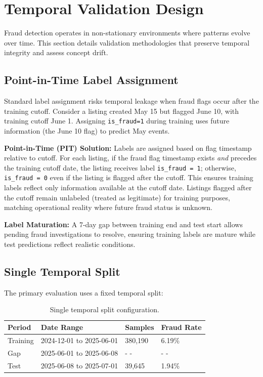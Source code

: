\section{Temporal Validation Design}
\label{sec:3_6}

Fraud detection operates in non-stationary environments where patterns evolve over time. This section details validation methodologies that preserve temporal integrity and assess concept drift.

\subsection{Point-in-Time Label Assignment}

Standard label assignment risks temporal leakage when fraud flags occur after the training cutoff. Consider a listing created May 15 but flagged June 10, with training cutoff June 1. Assigning \texttt{is\_fraud=1} during training uses future information (the June 10 flag) to predict May events.

\textbf{Point-in-Time (PIT) Solution:} Labels are assigned based on flag timestamp relative to cutoff. For each listing, if the fraud flag timestamp exists \emph{and} precedes the training cutoff date, the listing receives label \texttt{is\_fraud = 1}; otherwise, \texttt{is\_fraud = 0} even if the listing is flagged after the cutoff. This ensures training labels reflect only information available at the cutoff date. Listings flagged after the cutoff remain unlabeled (treated as legitimate) for training purposes, matching operational reality where future fraud status is unknown.

\textbf{Label Maturation:} A 7-day gap between training end and test start allows pending fraud investigations to resolve, ensuring training labels are mature while test predictions reflect realistic conditions.

\subsection{Single Temporal Split}

The primary evaluation uses a fixed temporal split:

\begin{table}[h]
\centering
\caption{Single temporal split configuration.}
\begin{tabular}{llll}
\hline
Period & Date Range & Samples & Fraud Rate \\
\hline
Training & 2024-12-01 to 2025-06-01 & 380,190 & 6.19\% \\
Gap & 2025-06-01 to 2025-06-08 & - - & - - \\
Test & 2025-06-08 to 2025-07-01 & 39,645 & 1.94\% \\
\hline
\end{tabular}
\end{table}

